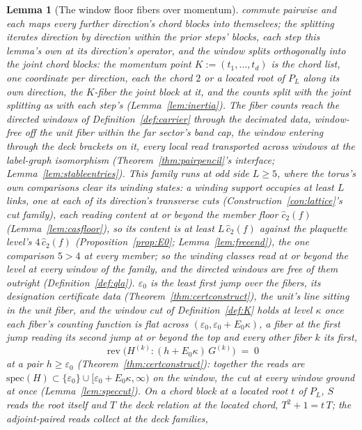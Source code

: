 \documentclass[11pt]{article}
\newtheorem{lemma}{Lemma}
\theoremstyle{definition}
\begin{document}
\begin{lemma}[The window floor fibers over momentum]
commute pairwise and each maps every further direction's chord
blocks into themselves; the splitting iterates direction by
direction within the prior steps' blocks, each step this lemma's
own at its direction's operator,
and the window splits orthogonally into the \emph{joint chord
blocks}: the \emph{momentum point} $K:=(t_1,\dots,t_d)$ is the
chord list, one coordinate per direction, each the chord $2$ or a
located root of $P_L$ along its own direction, the
\emph{$K$-fiber} the joint block at it, and the counts split with
the joint splitting as with each step's
(Lemma~\ref{lem:inertia}). The fiber counts reach the directed
windows of Definition~\ref{def:carrier} through the decimated data,
window-free off the unit fiber within the far sector's band cap, the
window entering through the deck brackets on it, every local read transported across windows at the
label-graph isomorphism (Theorem~\ref{thm:pairpencil}'s interface;
Lemma~\ref{lem:stableentries}). This
family runs at odd side $L\ge5$, where the torus's own comparisons
clear its winding states: a winding support occupies at least $L$
links, one at each of its direction's transverse cuts
(Construction~\ref{con:lattice}'s cut family), each reading content
at or beyond the member floor
$\hat c_2(f)$ (Lemma~\ref{lem:casfloor}), so its content is at
least $L\,\hat c_2(f)$ against the plaquette level's
$4\,\hat c_2(f)$ (Proposition~\ref{prop:E0};
Lemma~\ref{lem:freeend}), the one comparison $5>4$ at every member;
so the winding classes read at or beyond the level at every window
of the family, and the directed windows are free of them outright
(Definition~\ref{def:qla}). $\varepsilon_0$ is the least first jump over the fibers, its
designation certificate data (Theorem~\ref{thm:certconstruct}), the unit's
line sitting in the unit fiber, and the window cut of
Definition~\ref{def:K} holds at level $\kappa$ once each
fiber's counting function is flat across
$(\varepsilon_0,\varepsilon_0+E_0\kappa)$, a fiber at the first jump
reading its second jump at or beyond the top and every other fiber $k$
its first,
\[
\operatorname{rev}\big(H^{(k)}:(h+E_0\kappa)\,G^{(k)}\big)\;=\;0
\]
at a pair $h\ge\varepsilon_0$ (Theorem~\ref{thm:certconstruct}):
together the reads are
$\mathrm{spec}(H)\subset\{\varepsilon_0\}\cup
[\varepsilon_0+E_0\kappa,\infty)$ on the window, the cut at every
window ground at once (Lemma~\ref{lem:speccut}). On a chord block at
a located root $t$ of $P_L$, $S$ reads the root itself and $T$ the
deck relation at the located \emph{chord}, $T^2+1=t\,T$; the
adjoint-paired reads collect at the deck families,

\end{lemma}
\end{document}
